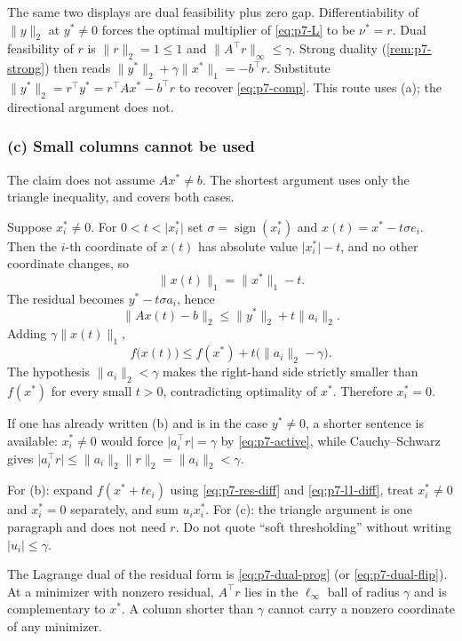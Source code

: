 \begin{remark}
\label{rem:p7-from-dual}
The same two displays are dual feasibility plus zero gap. Differentiability of \(\|y\|_{2}\) at \(y^{*}\neq 0\) forces the optimal multiplier of \eqref{eq:p7-L} to be \(\nu^{*}=r\). Dual feasibility of \(r\) is \(\|r\|_{2}=1\le 1\) and \(\|A^{\top}r\|_{\infty}\le\gamma\). Strong duality (\cref{rem:p7-strong}) then reads \(\|y^{*}\|_{2}+\gamma\|x^{*}\|_{1}=-b^{\top}r\). Substitute \(\|y^{*}\|_{2}=r^{\top}y^{*}=r^{\top}Ax^{*}-b^{\top}r\) to recover \eqref{eq:p7-comp}. This route uses (a); the directional argument does not.
\end{remark}

\subsubsection{(c) Small columns cannot be used}

The claim does not assume \(Ax^{*}\neq b\). The shortest argument uses only the triangle inequality, and covers both cases.

Suppose \(x_{i}^{*}\neq 0\). For \(0<t<\lvert x_{i}^{*}\rvert\) set \(\sigma=\operatorname{sign}(x_{i}^{*})\) and \(x(t)=x^{*}-t\sigma e_{i}\). Then the \(i\)-th coordinate of \(x(t)\) has absolute value \(\lvert x_{i}^{*}\rvert-t\), and no other coordinate changes, so
\[
\|x(t)\|_{1}=\|x^{*}\|_{1}-t.
\]
The residual becomes \(y^{*}-t\sigma a_{i}\), hence
\[
\|Ax(t)-b\|_{2}
\le
\|y^{*}\|_{2}+t\|a_{i}\|_{2}.
\]
Adding \(\gamma\|x(t)\|_{1}\),
\[
f\bigl(x(t)\bigr)
\le
f(x^{*})+t\bigl(\|a_{i}\|_{2}-\gamma\bigr).
\]
The hypothesis \(\|a_{i}\|_{2}<\gamma\) makes the right-hand side strictly smaller than \(f(x^{*})\) for every small \(t>0\), contradicting optimality of \(x^{*}\). Therefore \(x_{i}^{*}=0\).

If one has already written (b) and is in the case \(y^{*}\neq 0\), a shorter sentence is available: \(x_{i}^{*}\neq 0\) would force \(\lvert a_{i}^{\top}r\rvert=\gamma\) by \eqref{eq:p7-active}, while Cauchy--Schwarz gives \(\lvert a_{i}^{\top}r\rvert\le\|a_{i}\|_{2}\|r\|_{2}=\|a_{i}\|_{2}<\gamma\).

\begin{examnote}
\label{examnote:p7-bc}
For (b): expand \(f(x^{*}+te_{i})\) using \eqref{eq:p7-res-diff} and \eqref{eq:p7-l1-diff}, treat \(x_{i}^{*}\neq 0\) and \(x_{i}^{*}=0\) separately, and sum \(u_{i}x_{i}^{*}\). For (c): the triangle argument is one paragraph and does not need \(r\). Do not quote ``soft thresholding'' without writing \(\lvert u_{i}\rvert\le\gamma\).
\end{examnote}

\begin{summary}[Problem~7]
\label{sum:p7}
The Lagrange dual of the residual form is \eqref{eq:p7-dual-prog} (or \eqref{eq:p7-dual-flip}). At a minimizer with nonzero residual, \(A^{\top}r\) lies in the \(\ell_{\infty}\) ball of radius \(\gamma\) and is complementary to \(x^{*}\). A column shorter than \(\gamma\) cannot carry a nonzero coordinate of any minimizer.
\end{summary}
